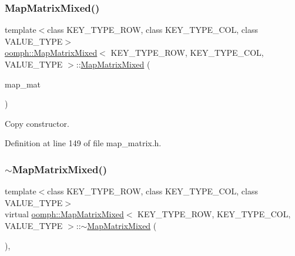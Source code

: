\subsubsection{\texorpdfstring{Map\+Matrix\+Mixed()}{MapMatrixMixed()}\hspace{0.1cm}{\footnotesize\ttfamily [2/2]}}
{\footnotesize\ttfamily template$<$class K\+E\+Y\+\_\+\+T\+Y\+P\+E\+\_\+\+R\+OW, class K\+E\+Y\+\_\+\+T\+Y\+P\+E\+\_\+\+C\+OL, class V\+A\+L\+U\+E\+\_\+\+T\+Y\+PE$>$ \\
\hyperlink{classoomph_1_1MapMatrixMixed}{oomph\+::\+Map\+Matrix\+Mixed}$<$ K\+E\+Y\+\_\+\+T\+Y\+P\+E\+\_\+\+R\+OW, K\+E\+Y\+\_\+\+T\+Y\+P\+E\+\_\+\+C\+OL, V\+A\+L\+U\+E\+\_\+\+T\+Y\+PE $>$\+::\hyperlink{classoomph_1_1MapMatrixMixed}{Map\+Matrix\+Mixed} (\begin{DoxyParamCaption}\item[{const \hyperlink{classoomph_1_1MapMatrixMixed}{Map\+Matrix\+Mixed}$<$ K\+E\+Y\+\_\+\+T\+Y\+P\+E\+\_\+\+R\+OW, K\+E\+Y\+\_\+\+T\+Y\+P\+E\+\_\+\+C\+OL, V\+A\+L\+U\+E\+\_\+\+T\+Y\+PE $>$ \&}]{map\+\_\+mat }\end{DoxyParamCaption})\hspace{0.3cm}{\ttfamily [inline]}}



Copy constructor. 



Definition at line 149 of file map\+\_\+matrix.\+h.

\mbox{\label{classoomph_1_1MapMatrixMixed_a7cf0f3eb68c457db64d4bd8213594618}} 
\subsubsection{\texorpdfstring{$\sim$\+Map\+Matrix\+Mixed()}{~MapMatrixMixed()}}
{\footnotesize\ttfamily template$<$class K\+E\+Y\+\_\+\+T\+Y\+P\+E\+\_\+\+R\+OW, class K\+E\+Y\+\_\+\+T\+Y\+P\+E\+\_\+\+C\+OL, class V\+A\+L\+U\+E\+\_\+\+T\+Y\+PE$>$ \\
virtual \hyperlink{classoomph_1_1MapMatrixMixed}{oomph\+::\+Map\+Matrix\+Mixed}$<$ K\+E\+Y\+\_\+\+T\+Y\+P\+E\+\_\+\+R\+OW, K\+E\+Y\+\_\+\+T\+Y\+P\+E\+\_\+\+C\+OL, V\+A\+L\+U\+E\+\_\+\+T\+Y\+PE $>$\+::$\sim$\hyperlink{classoomph_1_1MapMatrixMixed}{Map\+Matrix\+Mixed} (\begin{DoxyParamCaption}{ }\end{DoxyParamCaption})\hspace{0.3cm}{\ttfamily [inline]}, {\ttfamily [virtual]}}




